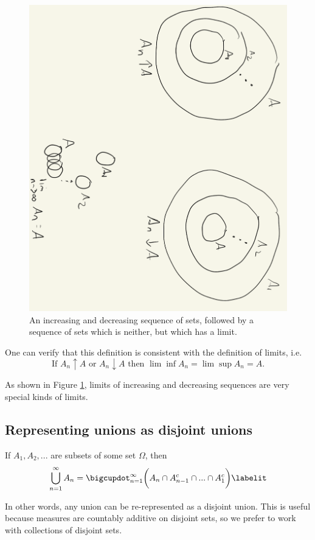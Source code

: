 \documentclass{article} %
\begin{document}
\begin{figure}[h!]
\centering 
\includegraphics[width=.5\textwidth, angle=90]{images/increasing_and_decreasing_sequences}
\caption{An increasing and decreasing sequence of sets, followed by a sequence of sets which is neither, but which has a limit.}
\label{fig:increasing_and_decreasing_limits_of_sets}
\end{figure}

One can verify that this definition is consistent with the definition of limits, i.e.
\[  \text{If } A_n \uparrow A \text{ or } A_n \downarrow A \text{ then } \lim\inf A_n = \lim\sup A_n = A.\]

As shown in Figure \ref{fig:increasing_and_decreasing_limits_of_sets}, limits of increasing and decreasing sequences are very special kinds of limits.


\subsection{Representing unions as disjoint unions} \label{sec:representing_unions_as_disjoint_unions}
 
\begin{remark}
If $A_1,A_2,...$ are subsets of some set $\Omega$, then
\begin{align*} 
\bigcup_{n=1}^\infty A_n = \bigcupdot_{n=1}^\infty \bigg(A_n \cap A_{n-1}^c \cap ... \cap A_1^c \bigg) 	
\labelit \label{eqn:union_as_disjoint_union}
\end{align*}

In other words, any union can be re-represented as a disjoint union. This is useful because measures are countably additive on disjoint sets, so we prefer to work with collections of disjoint sets.
\label{rk:rerepresenting_unions_as_disjoint_unions}
\end{remark}
\end{document}
